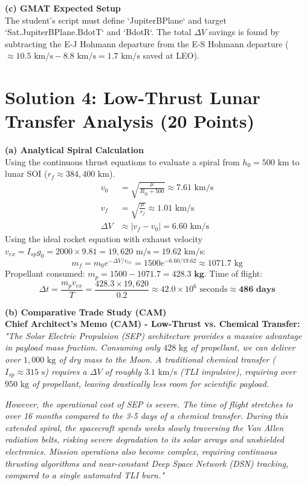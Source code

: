 \documentclass[11pt, letterpaper]{article}
\begin{document}
\textbf{(c) GMAT Expected Setup} \\
The student's script must define `JupiterBPlane` and target `Sat.JupiterBPlane.BdotT` and `BdotR`. The total $\Delta V$ savings is found by subtracting the E-J Hohmann departure from the E-S Hohmann departure ($\approx 10.5 \text{ km/s} - 8.8 \text{ km/s} = 1.7 \text{ km/s}$ saved at LEO).

\section*{Solution 4: Low-Thrust Lunar Transfer Analysis (20 Points)}

\textbf{(a) Analytical Spiral Calculation} \\
Using the continuous thrust equations to evaluate a spiral from $h_0 = 500 \text{ km}$ to lunar SOI ($r_f \approx 384,400 \text{ km}$). 
\begin{align*}
    v_0 &= \sqrt{\frac{\mu}{R_\oplus + 500}} \approx 7.61 \text{ km/s} \\
    v_f &= \sqrt{\frac{\mu}{r_f}} \approx 1.01 \text{ km/s} \\
    \Delta V &\approx |v_f - v_0| = 6.60 \text{ km/s}
\end{align*}
Using the ideal rocket equation with exhaust velocity $v_{ex} = I_{sp} g_0 = 2000 \times 9.81 = 19,620 \text{ m/s} = 19.62 \text{ km/s}$:
\begin{equation}
    m_f = m_0 e^{-\Delta V / v_{ex}} = 1500 e^{-6.60 / 19.62} \approx 1071.7 \text{ kg}
\end{equation}
Propellant consumed: $m_p = 1500 - 1071.7 = \mathbf{428.3 \text{ kg}}$.
Time of flight:
\begin{equation}
    \Delta t = \frac{m_p v_{ex}}{T} = \frac{428.3 \times 19,620}{0.2} \approx 42.0 \times 10^6 \text{ seconds} \approx \mathbf{486 \text{ days}}
\end{equation}

\textbf{(b) Comparative Trade Study (CAM)} \\
\textbf{Chief Architect's Memo (CAM) - Low-Thrust vs. Chemical Transfer:}
\textit{"The Solar Electric Propulsion (SEP) architecture provides a massive advantage in payload mass fraction. Consuming only $428 \text{ kg}$ of propellant, we can deliver over $1,000 \text{ kg}$ of dry mass to the Moon. A traditional chemical transfer ($I_{sp} \approx 315 \text{ s}$) requires a $\Delta V$ of roughly $3.1 \text{ km/s}$ (TLI impulsive), requiring over $950 \text{ kg}$ of propellant, leaving drastically less room for scientific payload. }

\textit{However, the operational cost of SEP is severe. The time of flight stretches to over 16 months compared to the 3-5 days of a chemical transfer. During this extended spiral, the spacecraft spends weeks slowly traversing the Van Allen radiation belts, risking severe degradation to its solar arrays and unshielded electronics. Mission operations also become complex, requiring continuous thrusting algorithms and near-constant Deep Space Network (DSN) tracking, compared to a single automated TLI burn."}
\end{document}
